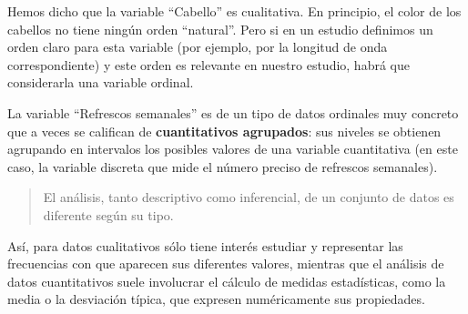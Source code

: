 \documentclass[
  letterpaper,
  DIV=11,
  numbers=noendperiod]{scrreprt}
\begin{document}
\begin{tcolorbox}[enhanced jigsaw, opacityback=0, coltitle=black, colbacktitle=quarto-callout-note-color!10!white, toprule=.15mm, colframe=quarto-callout-note-color-frame, colback=white, opacitybacktitle=0.6, toptitle=1mm, bottomtitle=1mm, rightrule=.15mm, breakable, titlerule=0mm, arc=.35mm, left=2mm, title=\textcolor{quarto-callout-note-color}{\faInfo}\hspace{0.5em}{Nota}, leftrule=.75mm, bottomrule=.15mm]

Hemos dicho que la variable ``Cabello'' es cualitativa. En principio, el
color de los cabellos no tiene ningún orden ``natural''. Pero si en un
estudio definimos un orden claro para esta variable (por ejemplo, por la
longitud de onda correspondiente) y este orden es relevante en nuestro
estudio, habrá que considerarla una variable ordinal.

\end{tcolorbox}

\begin{tcolorbox}[enhanced jigsaw, opacityback=0, coltitle=black, colbacktitle=quarto-callout-note-color!10!white, toprule=.15mm, colframe=quarto-callout-note-color-frame, colback=white, opacitybacktitle=0.6, toptitle=1mm, bottomtitle=1mm, rightrule=.15mm, breakable, titlerule=0mm, arc=.35mm, left=2mm, title=\textcolor{quarto-callout-note-color}{\faInfo}\hspace{0.5em}{Nota}, leftrule=.75mm, bottomrule=.15mm]

La variable ``Refrescos semanales'' es de un tipo de datos ordinales muy
concreto que a veces se califican de \textbf{cuantitativos agrupados}:
sus niveles se obtienen agrupando en intervalos los posibles valores de
una variable cuantitativa (en este caso, la variable discreta que mide
el número preciso de refrescos semanales).

\end{tcolorbox}

\begin{quote}
El análisis, tanto descriptivo como inferencial, de un conjunto de datos
es diferente según su tipo.
\end{quote}

Así, para datos cualitativos sólo tiene interés estudiar y representar
las frecuencias con que aparecen sus diferentes valores, mientras que el
análisis de datos cuantitativos suele involucrar el cálculo de medidas
estadísticas, como la media o la desviación típica, que expresen
numéricamente sus propiedades.
\end{document}

